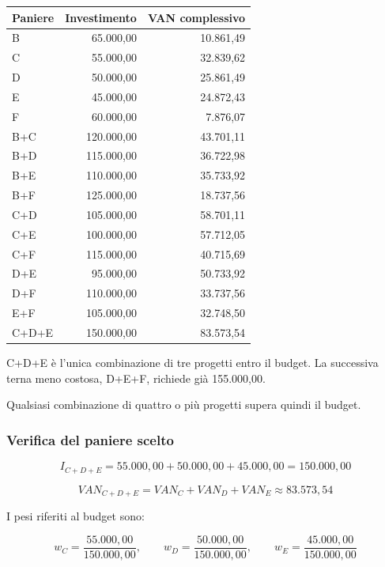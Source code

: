 \begin{center}
    \begin{tabular}{lrr}
        \hline
        Paniere & Investimento & VAN complessivo \\
        \hline
        B & 65.000,00 & 10.861,49 \\
        C & 55.000,00 & 32.839,62 \\
        D & 50.000,00 & 25.861,49 \\
        E & 45.000,00 & 24.872,43 \\
        F & 60.000,00 & 7.876,07 \\
        \hline
        B+C & 120.000,00 & 43.701,11 \\
        B+D & 115.000,00 & 36.722,98 \\
        B+E & 110.000,00 & 35.733,92 \\
        B+F & 125.000,00 & 18.737,56 \\
        C+D & 105.000,00 & 58.701,11 \\
        C+E & 100.000,00 & 57.712,05 \\
        C+F & 115.000,00 & 40.715,69 \\
        D+E & 95.000,00 & 50.733,92 \\
        D+F & 110.000,00 & 33.737,56 \\
        E+F & 105.000,00 & 32.748,50 \\
        \hline
        C+D+E & 150.000,00 & 83.573,54 \\
        \hline
    \end{tabular}
\end{center}

\noindent C+D+E è l'unica combinazione di tre progetti entro il budget.
La successiva terna meno costosa, D+E+F,
richiede già 155.000,00.

\noindent Qualsiasi combinazione di quattro o più progetti
supera quindi il budget.

\subsubsection*{Verifica del paniere scelto}

\[
    I_{C+D+E}
    =
    55.000{,}00+50.000{,}00+45.000{,}00
    =
    150.000{,}00
\]

\[
    VAN_{C+D+E}
    =
    VAN_C+VAN_D+VAN_E
    \approx83.573{,}54
\]

\noindent I pesi riferiti al budget sono:

\[
    w_C=\frac{55.000{,}00}{150.000{,}00},
    \qquad
    w_D=\frac{50.000{,}00}{150.000{,}00},
    \qquad
    w_E=\frac{45.000{,}00}{150.000{,}00}
\]

